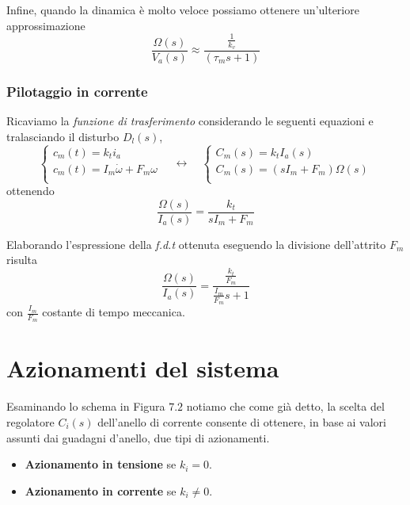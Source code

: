 Infine, quando la dinamica è molto veloce possiamo ottenere un'ulteriore approssimazione
\begin{equation}
	\frac{\Omega(s)}{V_a(s)} \approx \frac{\frac{1}{k_v}}{(\tau_m s + 1)}
\end{equation}

\subsubsection{Pilotaggio in corrente}
Ricaviamo la \emph{funzione di trasferimento} considerando le seguenti equazioni e tralasciando il disturbo $D_l(s)$,
\begin{equation}
	\begin{cases}
		c_m(t) = k_t i_a \\
		c_m(t) = I_m \dot{\omega} + F_m \omega \\
	\end{cases}
	\quad \longleftrightarrow \quad 
	\begin{cases}
		C_m(s) = k_t I_a(s) \\
		C_m(s) = (sI_m + F_m) \Omega(s) \\ 
	\end{cases}
\end{equation}
ottenendo
\begin{equation}
	\frac{\Omega(s)}{I_a(s)} = \frac{k_t}{sI_m + F_m}
\end{equation}

Elaborando l'espressione della \emph{f.d.t} ottenuta eseguendo la divisione dell'attrito $F_m$ risulta
\begin{equation}
	\frac{\Omega(s)}{I_a(s)} = \frac{\frac{k_t}{F_m}}{\frac{I_m}{F_m}s + 1}
\end{equation}
con $\frac{I_m}{F_m}$ costante di tempo meccanica.

\section{Azionamenti del sistema}
Esaminando lo schema in Figura $7.2$ notiamo che come già detto, la scelta del regolatore $C_i(s)$ dell'anello di corrente consente di ottenere, in base ai valori assunti dai guadagni d'anello, due tipi di azionamenti. 
\begin{itemize}
	\item \textbf{Azionamento in tensione} se $k_i = 0$.
	\item \textbf{Azionamento in corrente} se $k_i \neq 0$.
\end{itemize}

